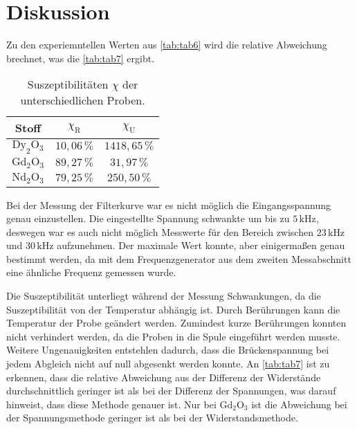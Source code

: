 \section{Diskussion}
\label{sec:Diskussion}

Zu den experiemntellen Werten aus \autoref{tab:tab6} wird die relative Abweichung brechnet, was die \autoref{tab:tab7} ergibt.

\begin{table}[H]
    \centering
    \caption{Suszeptibilitäten $\chi$ der unterschiedlichen Proben.}
    \label{tab:tab7}
    \begin{tabular}{S S S}
      \toprule
       {Stoff} & {$\chi_{\text{R}}$} & {$\chi_{\text{U}}$}  \\
      \midrule
      {$\text{Dy}_2\text{O}_3$}  &{$10,06 \, \%$}    &{$ 1418,65 \, \%$}\\
      {$\text{Gd}_2\text{O}_3$}  &{$89,27 \, \%$}    &{$ 31,97 \, \%$}\\
      {$\text{Nd}_2\text{O}_3$}  &{$79,25 \, \%$}    &{$ 250,50 \, \%$}\\
      \bottomrule
    \end{tabular}
\end{table}

Bei der Messung der Filterkurve war es nicht möglich die Eingangsspannung genau einzustellen. Die eingestellte Spannung schwankte um bis zu $ 5 \, \unit{\kilo\hertz}$, deswegen war es auch nicht möglich Messwerte für den Bereich zwischen $ 23 \, \unit{\kilo\hertz} $ und $ 30 \, \unit{\kilo\hertz} $  aufzunehmen.
Der maximale Wert konnte, aber einigermaßen genau bestimmt werden, da mit dem Frequenzgenerator aus dem zweiten Messabschnitt eine ähnliche Frequenz gemessen wurde.

Die Suszeptibilität unterliegt während der Messung Schwankungen, da die Suszeptibilität von der Temperatur abhängig ist. Durch Berührungen kann die Temperatur der Probe geändert werden. Zumindest kurze Berührungen konnten nicht verhindert werden, da die Proben in die Spule eingeführt werden musste.\\
Weitere Ungenauigkeiten entstehlen dadurch, dass die Brückenspannung bei jedem Abgleich nicht auf null abgesenkt werden konnte.
An \autoref{tab:tab7} ist zu erkennen, dass die relative Abweichung aus der Differenz der Widerstände durchschnittlich geringer ist als bei der Differenz der Spannungen, was darauf hinweist, dass diese Methode genauer ist.
Nur bei $\text{Gd}_2\text{O}_3$ ist die Abweichung bei der Spannungsmethode geringer ist als bei der Widerstandsmethode.
